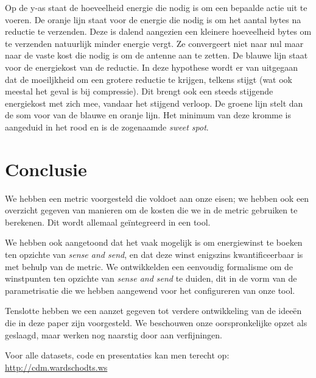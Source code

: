 \documentclass[11pt]{article}
\begin{document}
Op de y-as staat de hoeveelheid energie die nodig is om een bepaalde actie uit te voeren.
De oranje lijn staat voor de energie die nodig is om het aantal bytes na reductie te verzenden. Deze is dalend aangezien een kleinere hoeveelheid bytes om te verzenden natuurlijk minder energie vergt. Ze convergeert niet naar nul maar naar de vaste kost die nodig is om de antenne aan te zetten.
De blauwe lijn staat voor de energiekost van de reductie. In deze hypothese wordt er van uitgegaan dat de moeiljkheid om een grotere reductie te krijgen, telkens stijgt (wat ook meestal het geval is bij compressie). Dit brengt ook een steeds stijgende energiekost met zich mee, vandaar het stijgend verloop.
De groene lijn stelt dan de som voor van de blauwe en oranje lijn. Het minimum van deze kromme is aangeduid in het rood en is de zogenaamde \textit{sweet spot}. 

\section{Conclusie}

We hebben een metric voorgesteld die voldoet aan onze eisen; we hebben ook een
overzicht gegeven van manieren om de kosten die we in de metric gebruiken te
berekenen. Dit wordt allemaal ge\"integreerd in een tool.

We hebben ook aangetoond dat het vaak mogelijk is om energiewinst te boeken ten
opzichte van \textit{sense and send}, en dat deze winst enigszins
kwantificeerbaar is met behulp van de metric. We ontwikkelden een eenvoudig
formalisme om de winstpunten ten opzichte van \textit{sense and send} te duiden,
dit in de vorm van de parametrisatie die we hebben aangewend voor het
configureren van onze tool.

Tenslotte hebben we een aanzet gegeven tot verdere ontwikkeling van de idee\"en
die in deze paper zijn voorgesteld. We beschouwen onze oorspronkelijke opzet als
geslaagd, maar werken nog naarstig door aan verfijningen.

Voor alle datasets, code en presentaties kan men terecht op: \url{http://cdm.wardschodts.ws}


\nocite{*}

\end{document}
